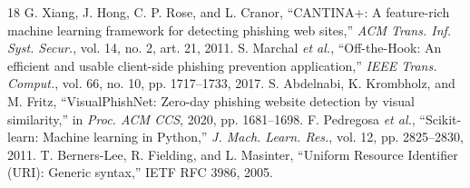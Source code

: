 \documentclass[12pt,a4paper]{report}
\begin{document}
\begin{thebibliography}{18}
 G. Xiang, J. Hong, C. P. Rose, and L. Cranor, ``CANTINA+: A feature-rich machine learning framework for detecting phishing web sites,'' \textit{ACM Trans. Inf. Syst. Secur.}, vol. 14, no. 2, art. 21, 2011.
 S. Marchal \textit{et al.}, ``Off-the-Hook: An efficient and usable client-side phishing prevention application,'' \textit{IEEE Trans. Comput.}, vol. 66, no. 10, pp. 1717--1733, 2017.
 S. Abdelnabi, K. Krombholz, and M. Fritz, ``VisualPhishNet: Zero-day phishing website detection by visual similarity,'' in \textit{Proc. ACM CCS}, 2020, pp. 1681--1698.
 F. Pedregosa \textit{et al.}, ``Scikit-learn: Machine learning in Python,'' \textit{J. Mach. Learn. Res.}, vol. 12, pp. 2825--2830, 2011.
 T. Berners-Lee, R. Fielding, and L. Masinter, ``Uniform Resource Identifier (URI): Generic syntax,'' IETF RFC 3986, 2005.
\end{thebibliography}
\end{document}
